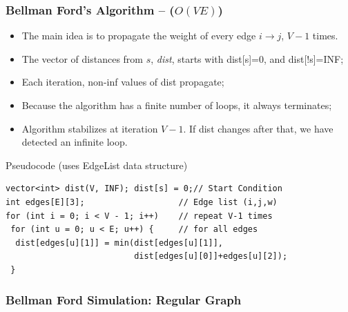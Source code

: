\begin{frame}[fragile]
  \frametitle{Bellman Ford's Algorithm -- ($O(VE)$)}
  {\smaller
  \begin{itemize}
    \item The main idea is to propagate the weight of every edge $i\to j$, $V-1$ times.

    \item The vector of distances from $s$, \emph{dist}, starts with dist[s]=0, and dist[!s]=INF;

    \item Each iteration, non-inf values of dist propagate;

    \item Because the algorithm has a finite number of loops, it always terminates;
    \item Algorithm stabilizes at iteration $V-1$. If dist changes after that, we have detected an infinite loop.
  \end{itemize}

  \begin{exampleblock}{Pseudocode (uses EdgeList data structure)}
\begin{verbatim}
vector<int> dist(V, INF); dist[s] = 0;// Start Condition
int edges[E][3];                   // Edge list (i,j,w)
for (int i = 0; i < V - 1; i++)    // repeat V-1 times
 for (int u = 0; u < E; u++) {     // for all edges
  dist[edges[u][1]] = min(dist[edges[u][1]],
                          dist[edges[u][0]]+edges[u][2]);
 }
\end{verbatim}
\end{exampleblock}}
\end{frame}

\begin{frame}
  \frametitle{Bellman Ford Simulation: Regular Graph}
  \begin{center}
  \end{center}
  \vspace{10cm}
\end{frame}

